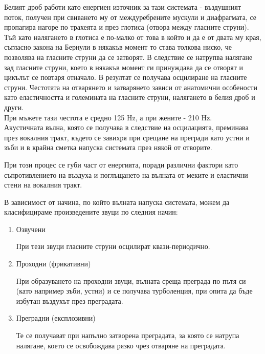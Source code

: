 \documentclass[main.tex]{subfiles}
\begin{document}
    Белият дроб работи като енергиен източник за тази системата - въздушният поток, получен при свиването му от междуребрените мускули и диафрагмата,
    се пропагира нагоре по трахеята и през глотиса (отвора между гласните струни).\\
    Тъй като налягането в глотиса е по-малко от това в който и да е от двата му края, съгласно закона на Бернули
    в някакъв момент то става толкова ниско, че позволява на гласните струни да се затворят. В следствие се натрупва налягане зад гласните струни, което в някакъв момент ги принуждава
    да се отворят и цикълът се повтаря отначало. В резултат се получава осцилиране на гласните струни. Честотата на отварянето и затварянето зависи от анатомични особености като еластичността и големината на
    гласните струни, налягането в белия дроб и други.\\
    При мъжете тази честота е средно 125 Hz, а при жените - 210 Hz.\\
    Акустичната вълна, която се получава в следствие на осцилацията,
    преминава през вокалния тракт, където се завихря при срещане на прегради като устни и зъби и в крайна сметка напуска системата през някой от отворите.

    При този процес се губи част от енергията, поради различни фактори като съпротивлението на въздуха и поглъщането на вълната от меките и еластични стени на вокалния тракт.

    В зависимост от начина, по който вълната напуска системата, можем да класифицираме произведените звуци по следния начин:

    \begin{enumerate}
        \item Озвучени

        При тези звуци гласните струни осцилират квази-периодично.
        
        \item Проходни (фрикативни) 
        
        При образуването на проходни звуци, вълната среща преграда по пътя си
        (като например зъби, устни) и се получава турболенция, при опита да бъде избутан въздухът през преградата.
        
        \item Преградни (експлозивни)
        
        Те се получават при напълно затворена преградата, за която се натрупа налягане, което се освобождава рязко чрез отваряне на преградата.
    \end{enumerate}
    
\end{document}

